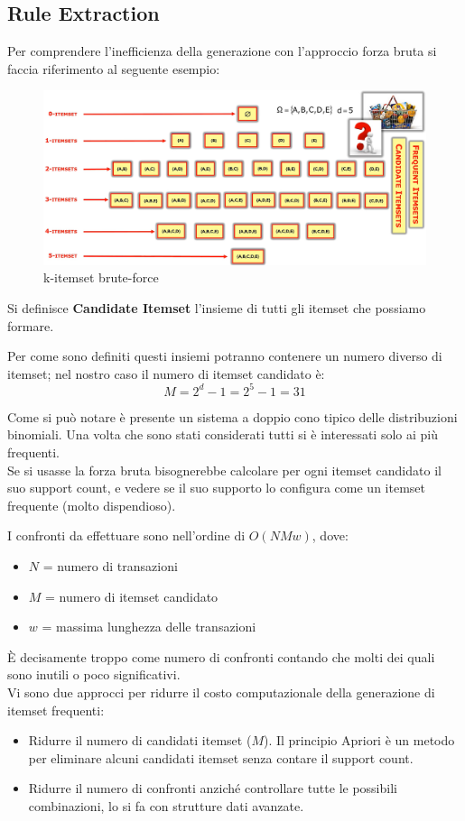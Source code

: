 \subsection{Rule Extraction}

Per comprendere l'inefficienza della generazione con l'approccio forza bruta si faccia riferimento al seguente esempio:
\begin{figure}[H]
	\hspace{-0.7 cm}
	\includegraphics[height=0.5 \linewidth]{association/pict/k-itemset.png}
	\caption{k-itemset brute-force}
\end{figure}
\begin{defn}
	Si definisce \textbf{Candidate Itemset} l'insieme di tutti gli itemset che possiamo formare. 
\end{defn}
Per come sono definiti questi insiemi potranno contenere un numero diverso di itemset; nel nostro caso il numero di itemset candidato è: 
\[M = 2^{d} - 1 = 2^5 -1 = 31\]

Come si può notare è presente un sistema a doppio cono tipico delle distribuzioni binomiali. Una volta che sono stati considerati tutti si è interessati solo ai più frequenti. \\
Se si usasse la forza bruta bisognerebbe calcolare per ogni itemset candidato il suo support count, e vedere se il suo supporto lo configura come un itemset frequente (molto dispendioso). 

I confronti da effettuare sono nell'ordine di $O(NMw)$, dove:
\begin{itemize}
	\item $N$ = numero di transazioni
	\item $M$ = numero di itemset candidato
	\item $w$ = massima lunghezza delle transazioni
\end{itemize} 
È decisamente troppo come numero di confronti contando che molti dei quali sono inutili o poco significativi.
\\ Vi sono due approcci per ridurre il costo computazionale della generazione di itemset frequenti:
\begin{itemize}
	\item Ridurre il numero di candidati itemset ($M$). Il principio Apriori è un metodo per eliminare alcuni candidati itemset senza contare il support count. 
	\item Ridurre il numero di confronti anziché controllare tutte le possibili combinazioni, lo si fa con strutture dati avanzate.
\end{itemize}

